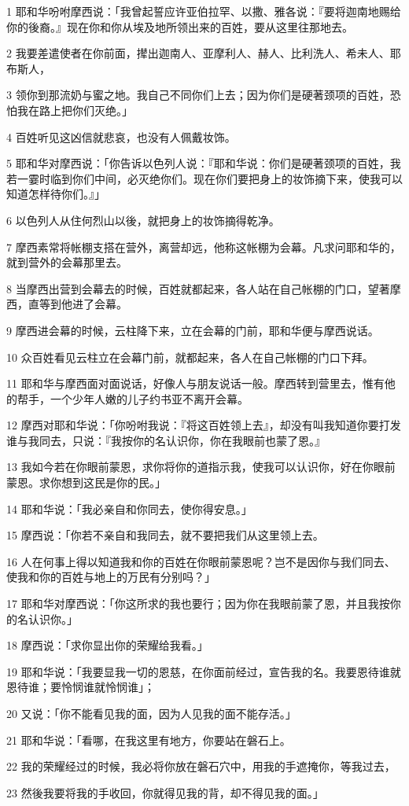 \par 1 耶和华吩咐摩西说：「我曾起誓应许亚伯拉罕、以撒、雅各说：『要将迦南地赐给你的後裔。』现在你和你从埃及地所领出来的百姓，要从这里往那地去。
\par 2 我要差遣使者在你前面，撵出迦南人、亚摩利人、赫人、比利洗人、希未人、耶布斯人，
\par 3 领你到那流奶与蜜之地。我自己不同你们上去；因为你们是硬著颈项的百姓，恐怕我在路上把你们灭绝。」
\par 4 百姓听见这凶信就悲哀，也没有人佩戴妆饰。
\par 5 耶和华对摩西说：「你告诉以色列人说：『耶和华说：你们是硬著颈项的百姓，我若一霎时临到你们中间，必灭绝你们。现在你们要把身上的妆饰摘下来，使我可以知道怎样待你们。』」
\par 6 以色列人从住何烈山以後，就把身上的妆饰摘得乾净。
\par 7 摩西素常将帐棚支搭在营外，离营却远，他称这帐棚为会幕。凡求问耶和华的，就到营外的会幕那里去。
\par 8 当摩西出营到会幕去的时候，百姓就都起来，各人站在自己帐棚的门口，望著摩西，直等到他进了会幕。
\par 9 摩西进会幕的时候，云柱降下来，立在会幕的门前，耶和华便与摩西说话。
\par 10 众百姓看见云柱立在会幕门前，就都起来，各人在自己帐棚的门口下拜。
\par 11 耶和华与摩西面对面说话，好像人与朋友说话一般。摩西转到营里去，惟有他的帮手，一个少年人嫩的儿子约书亚不离开会幕。
\par 12 摩西对耶和华说：「你吩咐我说：『将这百姓领上去』，却没有叫我知道你要打发谁与我同去，只说：『我按你的名认识你，你在我眼前也蒙了恩。』
\par 13 我如今若在你眼前蒙恩，求你将你的道指示我，使我可以认识你，好在你眼前蒙恩。求你想到这民是你的民。」
\par 14 耶和华说：「我必亲自和你同去，使你得安息。」
\par 15 摩西说：「你若不亲自和我同去，就不要把我们从这里领上去。
\par 16 人在何事上得以知道我和你的百姓在你眼前蒙恩呢？岂不是因你与我们同去、使我和你的百姓与地上的万民有分别吗？」
\par 17 耶和华对摩西说：「你这所求的我也要行；因为你在我眼前蒙了恩，并且我按你的名认识你。」
\par 18 摩西说：「求你显出你的荣耀给我看。」
\par 19 耶和华说：「我要显我一切的恩慈，在你面前经过，宣告我的名。我要恩待谁就恩待谁；要怜悯谁就怜悯谁」；
\par 20 又说：「你不能看见我的面，因为人见我的面不能存活。」
\par 21 耶和华说：「看哪，在我这里有地方，你要站在磐石上。
\par 22 我的荣耀经过的时候，我必将你放在磐石穴中，用我的手遮掩你，等我过去，
\par 23 然後我要将我的手收回，你就得见我的背，却不得见我的面。」

